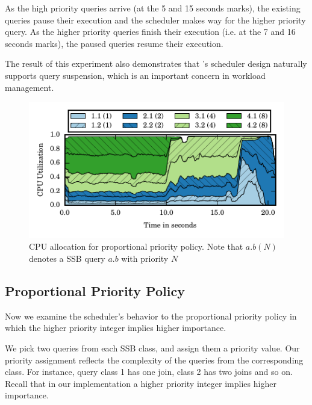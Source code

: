 As the high priority queries arrive (at the 5 and 15 seconds marks), the existing queries pause their execution and the scheduler makes way for the higher priority query.
As the higher priority queries finish their execution (i.e. at the 7 and 16 seconds marks), the paused queries resume their execution.

The result of this experiment also demonstrates that \sys{}'s scheduler design naturally supports query suspension, which is an important concern in workload management. 

\begin{figure}[h]
	\centering
	\includegraphics[width=\textwidth]{policy/figures/ssb-priority-uniform-2queries-perclass-cpu-util.pdf}
	\caption{CPU allocation for proportional priority policy. Note that $a.b  (N)$ denotes a SSB query $a.b$ with priority $N$}
	\label{fig:pp-cpu-util}
\end{figure}

\subsection{Proportional Priority Policy}
Now we examine the scheduler's behavior to the proportional priority policy %
in which the higher priority integer implies higher importance.

We pick two queries from each SSB class, and assign them a priority value. 
Our priority assignment reflects the complexity of the queries from the corresponding class. 
For instance, query class 1 has one join, class 2 has two joins and so on.
Recall that in our implementation a higher priority integer implies higher importance.

